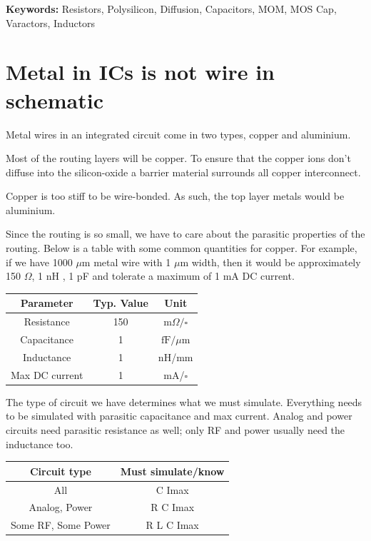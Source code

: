 \textbf{Keywords:} Resistors, Polysilicon, Diffusion, Capacitors, MOM,
MOS Cap, Varactors, Inductors

\section{Metal in ICs is not wire in
schematic}\label{metal-in-ics-is-not-wire-in-schematic}

Metal wires in an integrated circuit come in two types, copper and
aluminium.

Most of the routing layers will be copper. To ensure that the copper
ions don't diffuse into the silicon-oxide a barrier material surrounds
all copper interconnect.

Copper is too stiff to be wire-bonded. As such, the top layer metals
would be aluminium.

Since the routing is so small, we have to care about the parasitic
properties of the routing. Below is a table with some common quantities
for copper. For example, if we have 1000 \(\mu\)m metal wire with 1
\(\mu\)m width, then it would be approximately 150 \(\Omega\), 1 nH , 1
pF and tolerate a maximum of 1 mA DC current.

\begin{longtable}[]{@{}ccc@{}}
\toprule\noalign{}
Parameter & Typ. Value & Unit \\
\midrule\noalign{}
\endhead
\bottomrule\noalign{}
\endlastfoot
Resistance & 150 & \(\text{m}\Omega/\square\) \\
Capacitance & 1 & \(\text{fF}/\mu\text{m}\) \\
Inductance & 1 & nH/mm \\
Max DC current & 1 & mA/\(\square\) \\
\end{longtable}

The type of circuit we have determines what we must simulate. Everything
needs to be simulated with parasitic capacitance and max current. Analog
and power circuits need parasitic resistance as well; only RF and power
usually need the inductance too.

\begin{longtable}[]{@{}cc@{}}
\toprule\noalign{}
Circuit type & Must simulate/know \\
\midrule\noalign{}
\endhead
\bottomrule\noalign{}
\endlastfoot
All & C Imax \\
Analog, Power & R C Imax \\
Some RF, Some Power & R L C Imax \\
\end{longtable}

